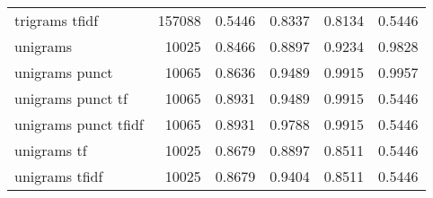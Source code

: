 \documentclass{article}
\begin{document}
\begin{table}
\begin{tabular}{lrrrrr}
trigrams tfidf             & 157088 & 0.5446 &       0.8337 &         0.8134 &               0.5446 \\
unigrams                   &  10025 & 0.8466 &       0.8897 &         0.9234 &               0.9828 \\
unigrams punct             &  10065 & 0.8636 &       0.9489 &         0.9915 &               0.9957 \\
unigrams punct tf          &  10065 & 0.8931 &       0.9489 &         0.9915 &               0.5446 \\
unigrams punct tfidf       &  10065 & 0.8931 &       0.9788 &         0.9915 &               0.5446 \\
unigrams tf                &  10025 & 0.8679 &       0.8897 &         0.8511 &               0.5446 \\
unigrams tfidf             &  10025 & 0.8679 &       0.9404 &         0.8511 &               0.5446 \\
\bottomrule
\end{tabular}

\end{table}
\end{document}

